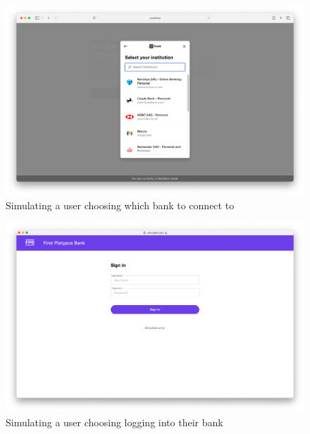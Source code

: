 \begin{figure}[H]
	\centering
    \includegraphics[scale=0.53]{bank_search.png}
	\vspace{-0.8cm}
    \caption{Simulating a user choosing which bank to connect to}
    \label{fig:bank_search}
\end{figure}

\begin{figure}[H]
	\centering
    \includegraphics[scale=0.53]{bank_login.png}
	\vspace{-0.8cm}
    \caption{Simulating a user choosing logging into their bank}
    \label{fig:bank_login}
\end{figure}

